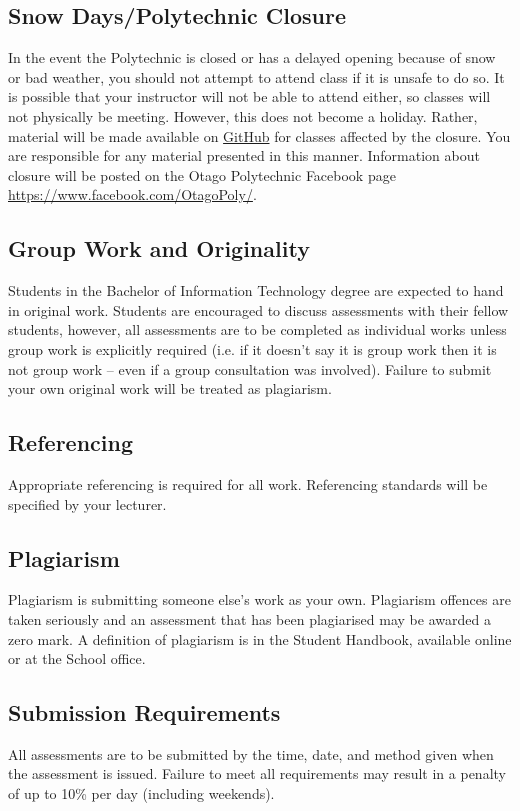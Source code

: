 \documentclass{article}
\begin{document}
\subsection*{Snow Days/Polytechnic Closure}
In the event the Polytechnic is closed or has a delayed opening because of snow or bad weather, you should not attempt to attend class if it is unsafe to do so. It is possible that your instructor will not be able to attend either, so classes will not physically be meeting. However, this does not become a holiday. Rather, material will be made available on \href{https://github.com/Grayson-Orr/Course-Files}{GitHub} for classes affected by the closure. You are responsible for any material presented in this manner. Information about closure will be posted on the Otago Polytechnic Facebook page \href{https://www.facebook.com/OtagoPoly/}{https://www.facebook.com/OtagoPoly/}.

\subsection*{Group Work and Originality}
Students in the Bachelor of Information Technology degree are expected to hand in original work. Students are encouraged to discuss assessments with their fellow students, however, all assessments are to be completed as individual works unless group work is explicitly required (i.e. if it doesn’t say it is group work then it is not group work – even if a group consultation was involved). Failure to submit your own original work will be treated as plagiarism.

\subsection*{Referencing}
Appropriate referencing is required for all work. Referencing standards will be specified by your lecturer.

\subsection*{Plagiarism}
Plagiarism is submitting someone else’s work as your own. Plagiarism offences are taken seriously and an assessment that has been plagiarised may be awarded a zero mark. A definition of plagiarism is in the Student Handbook, available online or at the School office.

\subsection*{Submission Requirements}
All assessments are to be submitted by the time, date, and method given when the assessment is issued. Failure to meet all requirements may result in a penalty of up to 10\% per day (including weekends).
\end{document}
